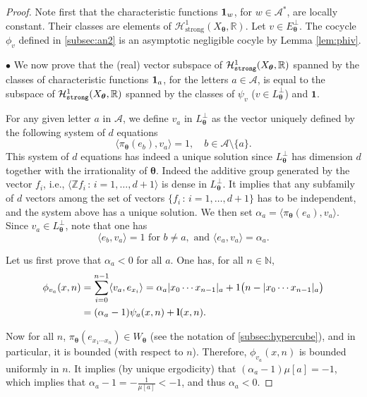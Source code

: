 \documentclass{article}
\theoremstyle{definition}
\newcommand{\cH}{\mathcal{H}}
\newcommand{\btheta}{\boldsymbol{\theta}}
\begin{document}
\begin{proof} 
 Note first  that the   characteristic  functions $ {\bf 1}_w$, for $w \in   \mathcal A^*$, are locally constant.
Their  classes   are   elements   of  $\cH^1_{\text{strong}}(X_{\btheta},\mathbb R)$.
Let $v \in  E_{\btheta}^\perp$. The cocycle $\phi_v$  defined in \cref{subsec:an2}
 is an asymptotic negligible cocyle by Lemma \ref{lem:phiv}. 


$\bullet$
 We now prove that   the   (real) vector subspace of $\cH^1_{\tt{strong}}(X_{\btheta},\mathbb R)$  spanned by the   classes
of  characteristic  functions ${\bf 1}_a$, for the letters $a \in {\mathcal A}$, is equal to the subspace of $\cH^1_{\tt{strong}}(X_{\btheta},\mathbb R)$  spanned by the   classes
of $\psi_v$ ($v \in L_{\btheta}^\perp$) and ${\mathbf 1}$.

For any  given  letter  $a$  in $ \mathcal A$,
we define   $v_a$ in $L_{\btheta}^\perp$  as  the  vector uniquely defined by   the following system of $d$ equations
  \[
  \langle \pi_{\btheta}(e_b), v_a \rangle = 1, \quad b \in \mathcal A \setminus \{a\}.
 \]
 This system of  $d$ equations has indeed a unique solution since  $L_{\btheta}^\perp$  has dimension $d$ together with the
   irrationality of $\btheta$.
Indeed the  additive group generated by the  vector $f_i$, i.e.,  $\langle \mathbb Z  f_i \,:\, i=1 ,\ldots, d+1 \rangle$ is dense in $L_{\btheta}^\perp$. It implies that any subfamily of $d$ vectors among the set of vectors  $\{ f_i \,:\, i=1 ,\ldots, d+1 \}$ has to be independent,
and  the system above has a unique solution.
 We  then  set $\alpha_a
  =  \langle \pi_{\btheta}(e_a), v_a \rangle . $ Since $v_a \in L_{\btheta}^\perp$,  note that 
one has   $$\langle e_b, v_a \rangle = 1 \mbox{  for } b \neq a, \mbox{  and  }\langle e_a, v_a \rangle =\alpha_a. $$
 
 
Let us  first  prove that $ \alpha_a <0$ for all $a$.  One has, for all $n \in {\mathbb N}$,  \begin{align} \label{eq:psi}
  \phi_{v_a}(x, n) & = \sum_{i=0}^{n-1} \langle v_a, e_{x_i} \rangle  = \alpha_a |x_0 \cdots x_{n-1}|_a + 1 \bigl( n-|x_0 \cdots x_{n-1}|_a \bigr)  \notag \\
      & = (\alpha_{a} - 1) \psi_a (x, n) + {\mathbf l} (x, n).
 \end{align}

 Now for all $n$, $\pi_{\btheta}(e_{x_1 \cdots x_n}) \in W_{\btheta}$ (see the notation of  \cref{subsec:hypercube}), and in particular, it  is bounded (with respect to $n$).
 Therefore, $\phi_{v_a}(x,n)$ is bounded uniformly in $n$.
 It implies (by unique ergodicity) that 
 $(\alpha_a - 1)\mu[a]=-1$, which  implies that  $\alpha_a-1= -\frac{1}{\mu[a]}<-1$, and thus  $ \alpha_a <0 .$ %
  

\end{proof}
\end{document}
